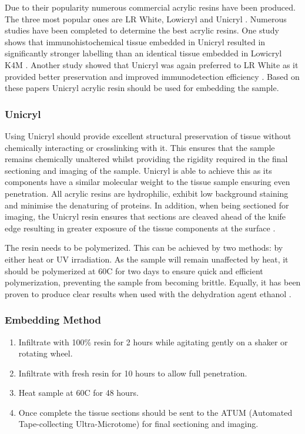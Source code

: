 \documentclass[a4paper, 11pt]{article}
\numberwithin{equation}{section}
\begin{document}
Due to their popularity numerous commercial acrylic resins have been produced. The three most popular ones are LR White, Lowicryl and Unicryl \cite{embeddinghistory}. Numerous studies have been completed to determine the best acrylic resins. One study shows that immunohistochemical tissue embedded in Unicryl resulted in significantly stronger labelling than an identical tissue embedded in Lowicryl K4M \cite{UnicrylversusLowicryl}. Another study showed that Unicryl was again preferred to LR White as it provided better preservation and improved immunodetection efficiency \cite{LRWhitevsUnicryl}. Based on these papers Unicryl acrylic resin should be used for embedding the sample.

\subsubsection{Unicryl}

Using Unicryl should provide excellent structural preservation of tissue without chemically interacting or crosslinking with it. This ensures that the sample remains chemically unaltered whilst providing the rigidity required in the final sectioning and imaging of the sample. Unicryl is able to achieve this as its components have a similar molecular weight to the tissue sample ensuring even penetration. All acrylic resins are hydrophilic, exhibit low background staining and minimise the denaturing of proteins. In addition, when being sectioned for imaging, the Unicryl resin ensures that sections are cleaved ahead of the knife edge resulting in greater exposure of the tissue components at the surface \cite{UNICRYL}.

The resin needs to be polymerized. This can be achieved by two methods: by either heat or UV irradiation. As the sample will remain unaffected by heat, it should be polymerized at 60\degree C for two days to ensure quick and efficient polymerization, preventing the sample from becoming brittle. Equally, it has been proven to produce clear results when used with the dehydration agent ethanol \cite{UNICRYL}.

\subsubsection{Embedding Method \cite{UNICRYL}}

\begin{enumerate} 
\item Infiltrate with 100\% resin for 2 hours while agitating gently on a shaker or rotating wheel.
\item Infiltrate with fresh resin for 10 hours to allow full penetration.
\item Heat sample at 60\degree C for 48 hours.
\item Once complete the tissue sections should be sent to the ATUM (Automated Tape-collecting Ultra-Microtome) for final sectioning and imaging.
\end{enumerate}
\end{document}
